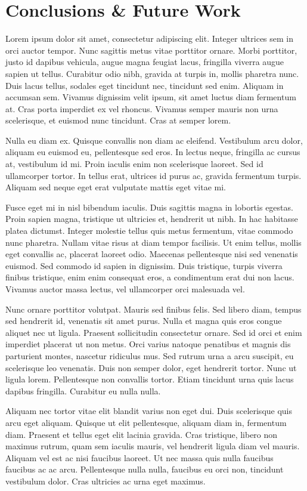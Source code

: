 \chapter{Conclusions \& Future Work}\label{c:conclusions}

Lorem ipsum dolor sit amet, consectetur adipiscing elit. Integer ultrices sem in orci auctor tempor. Nunc sagittis metus vitae porttitor ornare. Morbi porttitor, justo id dapibus vehicula, augue magna feugiat lacus, fringilla viverra augue sapien ut tellus. Curabitur odio nibh, gravida at turpis in, mollis pharetra nunc. Duis lacus tellus, sodales eget tincidunt nec, tincidunt sed enim. Aliquam in accumsan sem. Vivamus dignissim velit ipsum, sit amet luctus diam fermentum at. Cras porta imperdiet ex vel rhoncus. Vivamus semper mauris non urna scelerisque, et euismod nunc tincidunt. Cras at semper lorem.

Nulla eu diam ex. Quisque convallis non diam ac eleifend. Vestibulum arcu dolor, aliquam eu euismod eu, pellentesque sed eros. In lectus neque, fringilla ac cursus at, vestibulum id mi. Proin iaculis enim non scelerisque laoreet. Sed id ullamcorper tortor. In tellus erat, ultrices id purus ac, gravida fermentum turpis. Aliquam sed neque eget erat vulputate mattis eget vitae mi.

Fusce eget mi in nisl bibendum iaculis. Duis sagittis magna in lobortis egestas. Proin sapien magna, tristique ut ultricies et, hendrerit ut nibh. In hac habitasse platea dictumst. Integer molestie tellus quis metus fermentum, vitae commodo nunc pharetra. Nullam vitae risus at diam tempor facilisis. Ut enim tellus, mollis eget convallis ac, placerat laoreet odio. Maecenas pellentesque nisi sed venenatis euismod. Sed commodo id sapien in dignissim. Duis tristique, turpis viverra finibus tristique, enim enim consequat eros, a condimentum erat dui non lacus. Vivamus auctor massa lectus, vel ullamcorper orci malesuada vel.

Nunc ornare porttitor volutpat. Mauris sed finibus felis. Sed libero diam, tempus sed hendrerit id, venenatis sit amet purus. Nulla et magna quis eros congue aliquet nec ut ligula. Praesent sollicitudin consectetur ornare. Sed id orci et enim imperdiet placerat ut non metus. Orci varius natoque penatibus et magnis dis parturient montes, nascetur ridiculus mus. Sed rutrum urna a arcu suscipit, eu scelerisque leo venenatis. Duis non semper dolor, eget hendrerit tortor. Nunc ut ligula lorem. Pellentesque non convallis tortor. Etiam tincidunt urna quis lacus dapibus fringilla. Curabitur eu nulla nulla.

Aliquam nec tortor vitae elit blandit varius non eget dui. Duis scelerisque quis arcu eget aliquam. Quisque ut elit pellentesque, aliquam diam in, fermentum diam. Praesent et tellus eget elit lacinia gravida. Cras tristique, libero non maximus rutrum, quam sem iaculis mauris, vel hendrerit ligula diam vel mauris. Aliquam vel est ac nisi faucibus laoreet. Ut nec massa quis nulla faucibus faucibus ac ac arcu. Pellentesque nulla nulla, faucibus eu orci non, tincidunt vestibulum dolor. Cras ultricies ac urna eget maximus.

